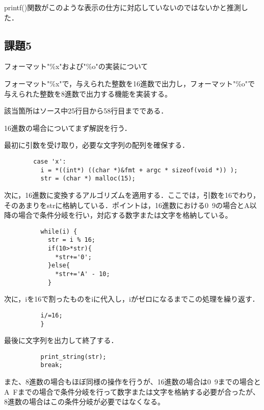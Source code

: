 \documentclass[a4j]{jarticle}
\begin{document}
printf()関数がこのような表示の仕方に対応していないのではないかと推測した．


\subsection{課題5}


フォーマット"\%x"および"\%o"の実装について

フォーマット"\%x"で，与えられた整数を16進数で出力し，フォーマット"\%o"で与えられた整数を8進数で出力する機能を実装する。

該当箇所はソース中25行目から58行目までである．

16進数の場合についてまず解説を行う．

最初に引数を受け取り，必要な文字列の配列を確保する．

\begin{verbatim}
        case 'x':
          i = *((int*) ((char *)&fmt + argc * sizeof(void *)) );
          str = (char *) malloc(15);
\end{verbatim}

次に，16進数に変換するアルゴリズムを適用する．ここでは，引数を16でわり，そのあまりをstrに格納している．ポイントは，16進数における0~9の場合とA以降の場合で条件分岐を行い，対応する数字または文字を格納している。

\begin{verbatim}
          while(i) {
            str = i % 16;
            if(10>*str){
              *str+='0';
            }else{
              *str+='A' - 10;
            }
\end{verbatim}

次に，iを16で割ったものをiに代入し，iがゼロになるまでこの処理を繰り返す．

\begin{verbatim}
          i/=16;
          }
\end{verbatim}

最後に文字列を出力して終了する．

\begin{verbatim}
          print_string(str);
          break;
\end{verbatim}

また、8進数の場合もほぼ同様の操作を行うが、16進数の場合は0~9までの場合とA~Fまでの場合で条件分岐を行って数字または文字を格納する必要が合ったが、8進数の場合はこの条件分岐が必要ではなくなる。




\newpage

%
%
\end{document}
